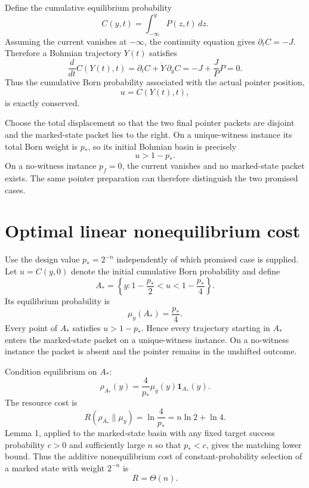 \documentclass[pdflatex,sn-mathphys-num]{sn-jnl}
\theoremstyle{thmstyleone}
\begin{document}
Define the cumulative equilibrium probability
\begin{equation}
C(y,t)=\int_{-\infty}^{y}P(z,t)\,dz.
\end{equation}
Assuming the current vanishes at $-\infty$, the continuity equation gives $\partial_tC=-J$. Therefore a Bohmian trajectory $Y(t)$ satisfies
\begin{equation}
\frac{d}{dt}C(Y(t),t)
=\partial_tC+\dot Y\,\partial_yC
=-J+\frac{J}{P}P=0.
\label{eq:cumulativeconservation}
\end{equation}
Thus the cumulative Born probability associated with the actual pointer position,
\begin{equation}
u=C(Y(t),t),
\end{equation}
is exactly conserved.

Choose the total displacement so that the two final pointer packets are disjoint and the marked-state packet lies to the right. On a unique-witness instance its total Born weight is $p_*$, so its initial Bohmian basin is precisely
\begin{equation}
u>1-p_*.
\label{eq:basin}
\end{equation}
On a no-witness instance $p_f=0$, the current vanishes and no marked-state packet exists. The same pointer preparation can therefore distinguish the two promised cases.

\section{Optimal linear nonequilibrium cost}

Use the design value $p_*=2^{-n}$ independently of which promised case is supplied. Let $u=C(y,0)$ denote the initial cumulative Born probability and define
\begin{equation}
A_*=
\left\{y:1-\frac{p_*}{2}<u<1-\frac{p_*}{4}\right\}.
\label{eq:shell}
\end{equation}
Its equilibrium probability is
\begin{equation}
\mu_y(A_*)=\frac{p_*}{4}.
\end{equation}
Every point of $A_*$ satisfies $u>1-p_*$. Hence every trajectory starting in $A_*$ enters the marked-state packet on a unique-witness instance. On a no-witness instance the packet is absent and the pointer remains in the unshifted outcome.

Condition equilibrium on $A_*$:
\begin{equation}
\rho_{A_*}(y)=\frac{4}{p_*}\mu_y(y)\mathbf 1_{A_*}(y).
\label{eq:conditioned}
\end{equation}
The resource cost is
\begin{equation}
R(\rho_{A_*}\|\mu_y)
=\ln\frac{4}{p_*}
=n\ln2+\ln4.
\label{eq:linearresource}
\end{equation}
Lemma 1, applied to the marked-state basin with any fixed target success probability $c>0$ and sufficiently large $n$ so that $p_*<c$, gives the matching lower bound. Thus the additive nonequilibrium cost of constant-probability selection of a marked state with weight $2^{-n}$ is
\begin{equation}
R=\Theta(n).
\end{equation}
\end{document}
